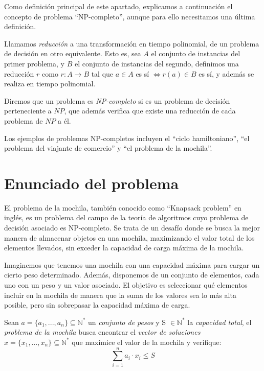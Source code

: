     Como definición principal de este apartado, explicamos a continuación el concepto de problema ``NP-completo'', aunque para ello necesitamos una última definición.

    \begin{definicion}
        Llamamos \textit{reducción} a una transformación en tiempo polinomial, de un problema de decisión en otro equivalente. Esto es, sea $A$ el conjunto de instancias del primer problema, y $B$ el conjunto de instancias del segundo, definimos una reducción $r$ como $r : A \rightarrow B$ tal que $a \in A$ es sí $\iff r(a) \in B$ es sí, y además se realiza en tiempo polinomial.
    \end{definicion}

    \begin{definicion} \label{def:2.7}
        Diremos que un problema es \textit{NP-completo} si es un problema de decisión perteneciente a $NP$, que además verifica que existe una reducción de cada problema de $NP$ a él.
    \end{definicion}

    Los ejemplos de problemas NP-completos incluyen el ``ciclo hamiltoniano'', ``el problema del viajante de comercio'' y ``el problema de la mochila''.
    
    \section{Enunciado del problema}

    El problema de la mochila, también conocido como ``Knapsack problem'' en inglés, es un problema del campo de la teoría de algoritmos cuyo problema de decisión asociado es NP-completo. Se trata de un desafío donde se busca la mejor manera de almacenar objetos en una mochila, maximizando el valor total de los elementos llevados, sin exceder la capacidad de carga máxima de la mochila.

    Imaginemos que tenemos una mochila con una capacidad máxima para cargar un cierto peso determinado. Además, disponemos de un conjunto de elementos, cada uno con un peso y un valor asociado. El objetivo es seleccionar qué elementos incluir en la mochila de manera que la suma de los valores sea lo más alta posible, pero sin sobrepasar la capacidad máxima de carga.

    \begin{definicion} \cite{artMH, defPM}  
        Sean $a = \{ a_{1}, ... , a_{n}\} \subseteq \mathbb{N}^{*}$ un \textit{conjunto de pesos} y S $\in \mathbb{N}^{*}$ la \textit{capacidad total}, el \textit{problema de la mochila} busca encontrar el \textit{vector de soluciones} $x = \{ x_{1}, ... , x_{n} \} \subseteq \mathbb{N}^{*}$ que maximice el valor de la mochila y verifique:
        \begin{equation} 
            \sum_{i=1}^{n} a_{i} \cdot x_{i} \leq S 
        \end{equation}
    \end{definicion}

